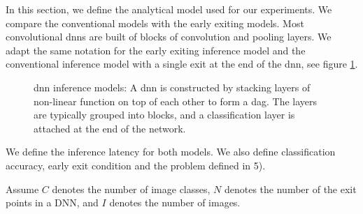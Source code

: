 In this section, we define the analytical model used for our experiments. We compare the conventional models with the early exiting models. Most convolutional \gls{dnn}s are built of blocks of convolution and pooling layers. We adapt the same notation for the early exiting inference model and the conventional inference model with a single exit at the end of the \gls{dnn}, see figure \ref{fig:inference_models}.
\begin{figure}
	\centering
	\captionsetup[subfigure]{justification=centering, farskip=1pt,captionskip=1pt}
	\hfill
	\caption[\gls{dnn} structure]{\gls{dnn} inference models: A \gls{dnn} is constructed by stacking layers of non-linear function on top of each other to form a \gls{dag}. The layers are typically grouped into blocks, and a classification layer is attached at the end of the network.}
	\label{fig:inference_models}
\end{figure}	
We define the inference latency for both models. We also define classification accuracy, early exit condition and the problem defined in 5). 

Assume $ C $ denotes the number of image classes, $ N $ denotes the number of the exit points in a DNN, and $ I $ denotes the number of images.


